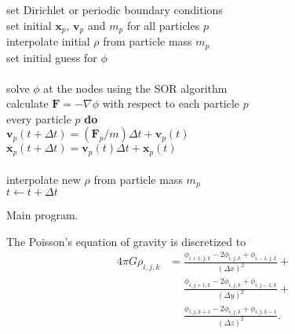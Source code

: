 \documentclass[notitlepage, 12pt]{article}
\begin{document}
\begin{algorithm}[H]
\hspace{0.1\textwidth}\parbox{.8\textwidth}{
\-\hspace{0ex}set Dirichlet or periodic boundary conditions\\
\-\hspace{0ex}set initial $\mathbf{x}_p$, $\mathbf{v}_p$ and $m_p$ for all particles $p$\\
\-\hspace{0ex}interpolate initial $\rho$ from particle mass $m_p$\\
\-\hspace{0ex}set initial guess for $\phi$\\
\-\hspace{0ex}{\bf loop}\\
\-\hspace{4ex}solve $\phi$ at the nodes using the SOR algorithm\\
\-\hspace{4ex}calculate $\mathbf{F}=-\nabla \phi$ with respect to each particle $p$\\
\-\hspace{4ex}{\bf for} every particle $p$ {\bf do}\\
\-\hspace{8ex}$\mathbf{v}_p(t+\Delta t) = (\mathbf{F}_p/m)\Delta t + \mathbf{v}_p(t)$\\
\-\hspace{8ex}$\mathbf{x}_p(t+\Delta t) = \mathbf{v}_p(t)\Delta t + \mathbf{x}_p(t)$\\
\-\hspace{4ex}{\bf end for}\\
\-\hspace{4ex}interpolate new $\rho$ from particle mass $m_p$\\
\-\hspace{4ex}$t\leftarrow t+\Delta t$\\
\-\hspace{0ex}{\bf end loop}}
\caption{Main program.}
\label{alg:main}
\end{algorithm}

The Poisson's equation of gravity is discretized to 
\begin{equation}
\begin{aligned}
4\pi G\rho_{i,j,k} &= \frac{\phi_{i+1,j,k}-2\phi_{i,j,k}+\phi_{i-1,j,k}}{(\Delta x)^2}+\\
& \phantom{{}={}} \frac{\phi_{i,j+1,k}-2\phi_{i,j,k}+\phi_{i,j-1,k}}{(\Delta y)^2}+\\
& \phantom{{}={}} \frac{\phi_{i,j,k+1}-2\phi_{i,j,k}+\phi_{i,j,k-1}}{(\Delta z)^2}.
\end{aligned}
\end{equation}
\end{document}
